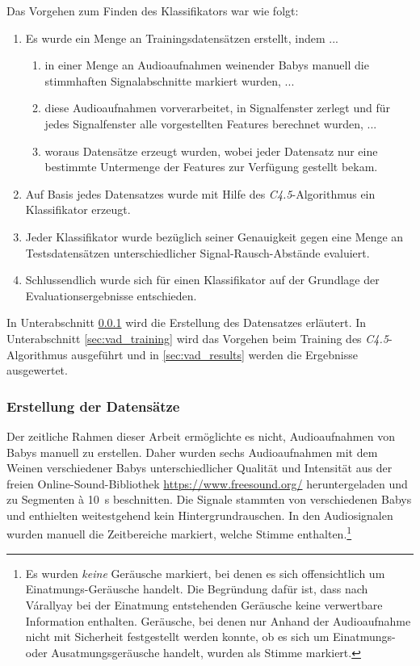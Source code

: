 \pagebreak

Das Vorgehen zum Finden des Klassifikators war wie folgt:
\begin{enumerate}
\item Es wurde ein Menge an Trainingsdatensätzen erstellt, indem ...
	\begin{enumerate}[label*=\arabic*.]
	\item in einer Menge an Audioaufnahmen weinender Babys manuell die stimmhaften Signalabschnitte markiert wurden, ...
	\item diese Audioaufnahmen vorverarbeitet, in Signalfenster zerlegt und für jedes Signalfenster alle vorgestellten Features berechnet wurden, ...
	\item woraus Datensätze erzeugt wurden, wobei jeder Datensatz nur eine bestimmte Untermenge der Features zur Verfügung gestellt bekam.
	\end{enumerate}
\item Auf Basis jedes Datensatzes wurde mit Hilfe des \emph{C4.5}-Algorithmus ein Klassifikator erzeugt.
\item Jeder Klassifikator wurde bezüglich seiner Genauigkeit gegen eine Menge an Testsdatensätzen unterschiedlicher Signal-Rausch-Abstände evaluiert.
\item Schlussendlich wurde sich für einen Klassifikator auf der Grundlage der Evaluationsergebnisse entschieden.
\end{enumerate}

In Unterabschnitt \ref{sec:vad_database} wird die Erstellung des Datensatzes erläutert. In Unterabschnitt \ref{sec:vad_training} wird das Vorgehen beim Training des \emph{C4.5}-Algorithmus ausgeführt und in \autoref{sec:vad_results} werden die Ergebnisse ausgewertet.

\subsubsection{Erstellung der Datensätze}
\label{sec:vad_database}

Der zeitliche Rahmen dieser Arbeit ermöglichte es nicht, Audioaufnahmen von Babys manuell zu erstellen. Daher wurden sechs Audioaufnahmen mit dem Weinen verschiedener Babys unterschiedlicher Qualität und Intensität aus der freien Online-Sound-Bibliothek \url{https://www.freesound.org/} heruntergeladen und zu Segmenten \`{a} \SI{10}{\second} beschnitten. Die Signale stammten von verschiedenen Babys und enthielten weitestgehend kein Hintergrundrauschen. In den Audiosignalen wurden manuell die Zeitbereiche markiert, welche Stimme enthalten.\footnote{Es wurden \emph{keine} Geräusche markiert, bei denen es sich offensichtlich um Einatmungs-Geräusche handelt. Die Begründung dafür ist, dass nach Várallyay \cite[S. 4]{cry_thesis} bei der Einatmung entstehenden Geräusche keine verwertbare Information enthalten. Geräusche, bei denen nur Anhand der Audioaufnahme nicht mit Sicherheit festgestellt werden konnte, ob es sich um Einatmungs- oder Ausatmungsgeräusche handelt, wurden als Stimme markiert.}

